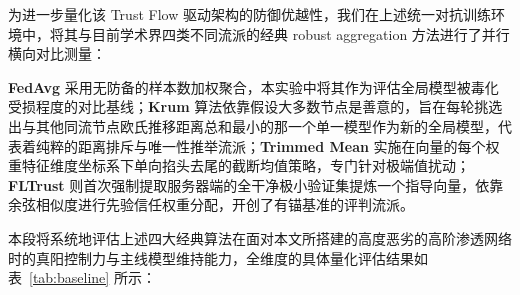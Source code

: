 \documentclass[runningheads]{llncs}
\begin{document}
为进一步量化该 Trust Flow 驱动架构的防御优越性，我们在上述统一对抗训练环境中，将其与目前学术界四类不同流派的经典 robust aggregation 方法进行了并行横向对比测量：

\textbf{FedAvg}\cite{mcmahan2017fedavg} 采用无防备的样本数加权聚合，本实验中将其作为评估全局模型被毒化受损程度的对比基线；\textbf{Krum}\cite{blanchard2017krum} 算法依靠假设大多数节点是善意的，旨在每轮挑选出与其他同流节点欧氏推移距离总和最小的那一个单一模型作为新的全局模型，代表着纯粹的距离排斥与唯一性推举流派；\textbf{Trimmed Mean}\cite{yin2018byzantine} 实施在向量的每个权重特征维度坐标系下单向掐头去尾的截断均值策略，专门针对极端值扰动；\textbf{FLTrust}\cite{cao2021fltrust} 则首次强制提取服务器端的全干净极小验证集提炼一个指导向量，依靠余弦相似度进行先验信任权重分配，开创了有锚基准的评判流派。

本段将系统地评估上述四大经典算法在面对本文所搭建的高度恶劣的高阶渗透网络时的真阳控制力与主线模型维持能力，全维度的具体量化评估结果如表~\ref{tab:baseline} 所示：
\end{document}

